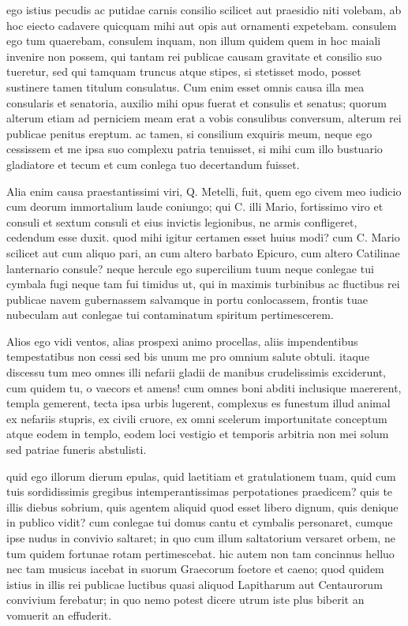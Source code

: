  ego istius pecudis ac putidae carnis consilio scilicet aut praesidio niti volebam, ab hoc eiecto cadavere quicquam mihi aut opis aut ornamenti expetebam. consulem ego tum quaerebam, consulem inquam, non illum quidem quem in hoc maiali invenire non possem, qui tantam rei publicae causam gravitate et consilio suo tueretur, sed qui tamquam truncus atque stipes, si stetisset modo, posset sustinere tamen titulum consulatus. Cum enim esset omnis causa illa mea consularis et senatoria, auxilio mihi opus fuerat et consulis et senatus; quorum alterum etiam ad perniciem meam erat a vobis consulibus conversum, alterum rei publicae penitus ereptum. ac tamen, si consilium exquiris meum, neque ego cessissem et me ipsa suo complexu patria tenuisset, si mihi cum illo bustuario gladiatore et tecum et cum conlega tuo decertandum fuisset.

 Alia enim causa praestantissimi viri, Q. Metelli, fuit, quem ego civem meo iudicio cum deorum immortalium laude coniungo; qui C. illi Mario, fortissimo viro et consuli et sextum consuli et eius invictis legionibus, ne armis confligeret, cedendum esse duxit. quod mihi igitur certamen esset huius modi? cum C. Mario scilicet aut cum aliquo pari, an cum altero barbato Epicuro, cum altero Catilinae lanternario consule? neque hercule ego supercilium tuum neque conlegae tui cymbala fugi neque tam fui timidus ut, qui in maximis turbinibus ac fluctibus rei publicae navem gubernassem salvamque in portu conlocassem, frontis tuae nubeculam aut conlegae tui contaminatum spiritum pertimescerem.

 Alios ego vidi ventos, alias prospexi animo procellas, aliis impendentibus tempestatibus non cessi sed bis unum me pro omnium salute obtuli. itaque discessu tum meo omnes illi nefarii gladii de manibus crudelissimis exciderunt, cum quidem tu, o vaecors et amens! cum omnes boni abditi inclusique maererent, templa gemerent, tecta ipsa urbis lugerent, complexus es funestum illud animal ex nefariis stupris, ex civili cruore, ex omni scelerum importunitate conceptum atque eodem in templo, eodem loci vestigio et temporis arbitria non mei solum sed patriae funeris abstulisti.

 quid ego illorum dierum epulas, quid laetitiam et gratulationem tuam, quid cum tuis sordidissimis gregibus intemperantissimas perpotationes praedicem? quis te illis diebus sobrium, quis agentem aliquid quod esset libero dignum, quis denique in publico vidit? cum conlegae tui domus cantu et cymbalis personaret, cumque ipse nudus in convivio saltaret; in quo cum illum saltatorium versaret orbem, ne tum quidem fortunae rotam pertimescebat. hic autem non tam concinnus helluo nec tam musicus iacebat in suorum Graecorum foetore et caeno; quod quidem istius in illis rei publicae luctibus quasi aliquod Lapitharum aut Centaurorum convivium ferebatur; in quo nemo potest dicere utrum iste plus biberit an vomuerit an effuderit.

